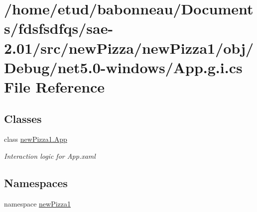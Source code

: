 \hypertarget{net5_80-windows_2App_8g_8i_8cs}{}\section{/home/etud/babonneau/\+Documents/fdsfsdfqs/sae-\/2.01/src/new\+Pizza/new\+Pizza1/obj/\+Debug/net5.0-\/windows/\+App.g.\+i.\+cs File Reference}
\label{net5_80-windows_2App_8g_8i_8cs}
\subsection*{Classes}
\begin{DoxyCompactItemize}
\item 
class \hyperlink{classnewPizza1_1_1App}{new\+Pizza1.\+App}
\begin{DoxyCompactList}\small\item\em Interaction logic for App.\+xaml \end{DoxyCompactList}\end{DoxyCompactItemize}
\subsection*{Namespaces}
\begin{DoxyCompactItemize}
\item 
namespace \hyperlink{namespacenewPizza1}{new\+Pizza1}
\end{DoxyCompactItemize}
